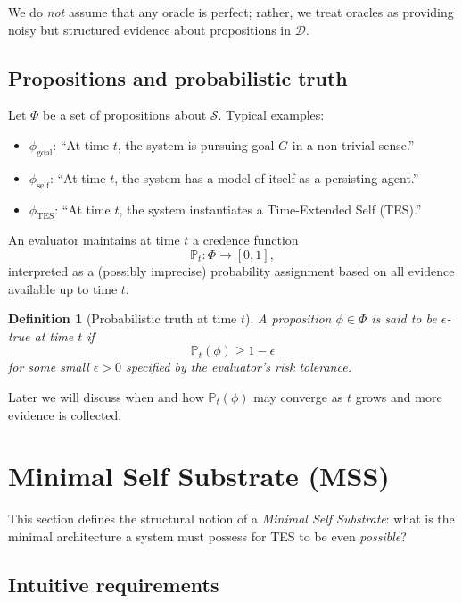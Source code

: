 \documentclass[11pt]{article}
\newtheorem{definition}{Definition}
\newcommand{\Pp}{\mathbb{P}}
\newcommand{\1}{\mathbf{1}}
\begin{document}
We do \emph{not} assume that any oracle is perfect; rather, we treat oracles
as providing noisy but structured evidence about propositions in $\mathcal{D}$.

\subsection{Propositions and probabilistic truth}

Let $\Phi$ be a set of propositions about $\mathcal{S}$.
Typical examples:

\begin{itemize}[leftmargin=2em]
  \item $\phi_{\text{goal}}$: \enquote{At time $t$, the system is pursuing
  goal $G$ in a non-trivial sense.}
  \item $\phi_{\text{self}}$: \enquote{At time $t$, the system has a model of
  itself as a persisting agent.}
  \item $\phi_{\text{TES}}$: \enquote{At time $t$, the system instantiates
  a Time-Extended Self (TES).}
\end{itemize}

An evaluator maintains at time $t$ a credence function
\[
  \Pp_t : \Phi \to [0,1],
\]
interpreted as a (possibly imprecise) probability assignment based on
all evidence available up to time $t$.

\begin{definition}[Probabilistic truth at time $t$]
A proposition $\phi \in \Phi$ is said to be \emph{$\epsilon$-true at time $t$}
if
\[
  \Pp_t(\phi) \ge 1 - \epsilon
\]
for some small $\epsilon > 0$ specified by the evaluator's risk tolerance.
\end{definition}

Later we will discuss when and how $\Pp_t(\phi)$ may converge as $t$ grows and
more evidence is collected.

\section{Minimal Self Substrate (MSS)}

This section defines the structural notion of a \emph{Minimal Self Substrate}:
what is the minimal architecture a system must possess for TES to be even
\emph{possible}?

\subsection{Intuitive requirements}
\end{document}
